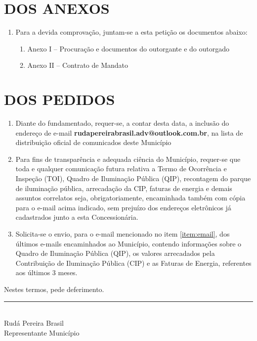 \documentclass[12pt,a4paper]{article}
\begin{document}
\section{DOS ANEXOS}

\begin{enumerate}[resume  ]
\item Para a devida comprovação, juntam-se a esta petição os documentos abaixo:
  \begin{enumerate}
    \item Anexo I – Procuração e documentos do outorgante e do outorgado
    \item Anexo II – Contrato de Mandato
  \end{enumerate}
\end{enumerate}

\section{DOS PEDIDOS}

\begin{enumerate}[resume  ]
  \item Diante do fundamentado, requer-se, a contar desta data, a inclusão do endereço de e-mail \textbf{rudapereirabrasil.adv@outlook.com.br}, na lista de distribuição oficial de comunicados deste Município
  \label{item:email} 
  \item Para fins de transparência e adequada ciência do Município, requer-se que toda e qualquer comunicação futura relativa a Termo de Ocorrência e Inspeção (TOI), Quadro de Iluminação Pública (QIP), recontagem do parque de iluminação pública, arrecadação da CIP, faturas de energia e demais assuntos correlatos seja, obrigatoriamente, encaminhada também com cópia para o e-mail acima indicado, sem prejuízo dos endereços eletrônicos já cadastrados junto a esta Concessionária. 
  \item Solicita-se o envio, para o e-mail mencionado no item \ref{item:email}, dos últimos e-mails encaminhados ao Município, contendo informações sobre o Quadro de Iluminação Pública (QIP), os valores arrecadados pela Contribuição de Iluminação Pública (CIP) e as Faturas de Energia, referentes aos últimos 3 meses.
\end{enumerate}

Nestes termos, pede deferimento.

\centering
\begin{minipage}{0.45\textwidth}
\vspace{2cm}
\centering
\rule{\linewidth}{0.4pt}\\
Rudá Pereira Brasil\\
{\small Representante Município}
\end{minipage}
\end{document}
